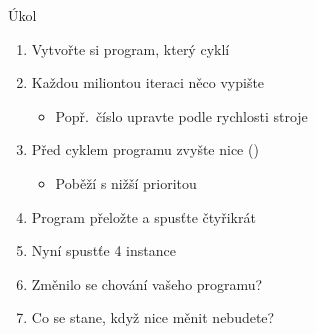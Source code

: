 \begin{frame}{Úkol}

  \begin{enumerate}
    \item Vytvořte si program, který cyklí
    \item Každou miliontou iteraci něco vypište
    \begin{itemize}
      \item Popř.\ číslo upravte podle rychlosti stroje
    \end{itemize}

    \item Před cyklem programu zvyšte nice ()
    \begin{itemize}
      \item Poběží s nižší prioritou
    \end{itemize}

    \item Program přeložte a spusťte čtyřikrát

    \item Nyní spustťe 4 instance 
    \item Změnilo se chování vašeho programu?
    \item Co se stane, když nice měnit nebudete?
  \end{enumerate}

\end{frame}

